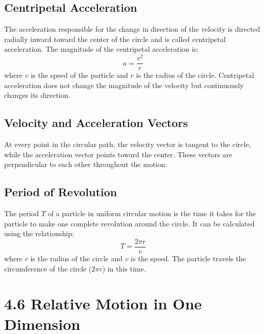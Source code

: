 \documentclass{article}
\begin{document}
\subsection*{Centripetal Acceleration}

The acceleration responsible for the change in direction of the velocity is directed radially inward toward the center of the circle and is called centripetal acceleration. The magnitude of the centripetal acceleration is:
\[
a = \frac{v^2}{r}
\]
where $v$ is the speed of the particle and $r$ is the radius of the circle. Centripetal acceleration does not change the magnitude of the velocity but continuously changes its direction.

\subsection*{Velocity and Acceleration Vectors}

At every point in the circular path, the velocity vector is tangent to the circle, while the acceleration vector points toward the center. These vectors are perpendicular to each other throughout the motion.

\subsection*{Period of Revolution}

The period $T$ of a particle in uniform circular motion is the time it takes for the particle to make one complete revolution around the circle. It can be calculated using the relationship:
\[
T = \frac{2\pi r}{v}
\]
where $r$ is the radius of the circle and $v$ is the speed. The particle travels the circumference of the circle ($2\pi r$) in this time.

\section*{4.6 Relative Motion in One Dimension}
\end{document}
